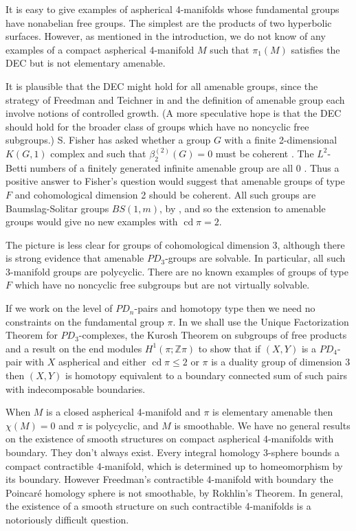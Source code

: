 \documentclass[12pt]{amsart}
\renewcommand{\leq}{\leqslant}
\theoremstyle{definition}
\newcommand{\Z}{\mathbb Z}
\DeclareMathOperator{\cd}{cd}
\begin{document}
It is easy to give examples of aspherical 4-manifolds whose fundamental groups
have nonabelian free groups.
The simplest are the products of two hyperbolic surfaces.
However,  as mentioned in the introduction, 
we do not know of any examples of a compact aspherical 4-manifold $M$ 
such that $\pi_1(M)$ satisfies the DEC but is not elementary amenable.

It is plausible that the DEC might hold for all amenable groups, 
since the strategy of Freedman and Teichner in \cite{FT95} 
and the definition of amenable group each involve notions of controlled growth.
(A more speculative hope is that the DEC should hold for the broader class
of groups which have no noncyclic free subgroups.)
S. Fisher has asked whether a group $G$ with a finite 2-dimensional $K(G,1)$ complex
and such that $\beta_2^{(2)}(G)=0$ must be coherent  \cite{Fi24}.
The $L^2$-Betti numbers of a finitely generated infinite amenable group are all 0
\cite{CG86}.
Thus a positive answer to Fisher's question would suggest that amenable groups 
of type $F$ and cohomological dimension 2 should be coherent.
All such groups are Baumslag-Solitar groups $BS(1,m)$,
by \cite[Corollary 2.6.1]{HiF}, 
and so the extension to amenable groups would give no new examples with $\cd\pi=2$.

The picture is less clear for groups of cohomological dimension 3,
although there is strong evidence that amenable $PD_3$-groups are solvable.
In particular, all such 3-manifold groups are polycyclic.
There are no known examples of groups of type $F$ which have 
no noncyclic free subgroups but are not virtually solvable.

If we work on the level of $PD_n$-pairs and homotopy type then 
we need no constraints on the fundamental group $\pi$.
In \cite{dh3} we shall use the Unique Factorization Theorem for $PD_3$-complexes,
the Kurosh Theorem on subgroups of free products and a result on the end modules
$H^1(\pi;\Z\pi)$ to show that if $(X,Y)$ is a $PD_4$-pair with $X$ aspherical and
either $\cd\pi\leq2$ or $\pi$ is a duality group of dimension 3 
then $(X,Y)$ is homotopy equivalent to a boundary connected sum of such pairs 
with indecomposable boundaries.

When $M$ is a closed aspherical 4-manifold and $\pi$ is elementary amenable then
$\chi(M)=0$ and $\pi$ is polycyclic, and $M$ is smoothable.
We have no general results on the existence of smooth structures 
on  compact aspherical 4-manifolds with boundary.   
They don't always exist.
Every integral homology 3-sphere bounds a compact contractible 4-manifold,
which is determined up to homeomorphism by its boundary.
However Freedman's contractible 4-manifold with boundary the Poincar\'e homology
sphere is not smoothable, by Rokhlin's Theorem.
In general,
the existence of a smooth structure  on such contractible 4-manifolds
is a notoriously difficult question.
\end{document}
